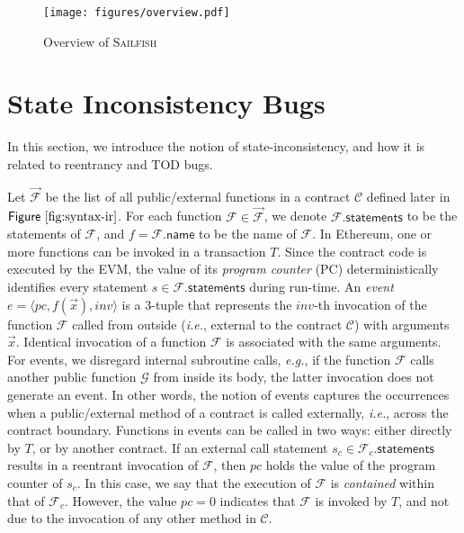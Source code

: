\documentclass[conference, romanappendices]{tex/IEEEtran}
\theoremstyle{bfnote}
\newcommand{\toolname}{\textsc{Sailfish}\xspace}
\newcommand{\ethereum}{Ethereum}
\newcommand{\reentrancy}{{reentrancy}\xspace}
\newcommand{\si}{{state-inconsistency}\xspace}
\newcommand{\eg}{\textit{e.g.}}
\newcommand{\ie}{\textit{i.e.}}
\newcommand{\Fig}[1]{\ensuremath{\sf Figure~\ref{#1}}}
\begin{document}
\begin{figure}[t]
	\vspace{-2mm}
	\centering
	\texttt{[image: figures/overview.pdf]}
	\vspace{-10mm}
	\caption{Overview of \toolname}
	\label{fig:overview}
	\vspace{-6.5mm}
\end{figure}
 	\section{State Inconsistency Bugs}
\label{si_bugs}
In this section, we introduce the notion of \si, and how it is related to \reentrancy and TOD bugs.

Let $\vec{\mathcal{F}}$ be the list of all public/external functions in a contract $\mathcal{C}$ defined later in \Fig{fig:syntax-ir}.
For each function $\mathcal{F} \in \vec{\mathcal{F}}$, we denote $\mathcal{F}.\mathsf{statements}$ to be the statements of $\mathcal{F}$, and $f = \mathcal{F}.\mathsf{name}$ to be the name of $\mathcal{F}$.
In \ethereum, one or more functions can be invoked in a transaction $T$.
Since the contract code is executed by the EVM, the value of its \textit{program counter} (PC) deterministically identifies every statement $s \in \mathcal{F}.\mathsf{statements}$ during run-time.
An \textit{event} $e = \langle pc, f(\vec{x}), inv \rangle$ is a $3$-tuple that represents the $inv$-th invocation of the function $\mathcal{F}$ called from outside (\ie, external to the contract $\mathcal{C}$) with arguments $\vec{x}$.
Identical invocation of a function $\mathcal{F}$ is associated with the same arguments.
For events, we disregard internal subroutine calls, \eg, if the function $\mathcal{F}$ calls another public function $\mathcal{G}$ from inside its body, the latter invocation does not generate an event.
In other words, the notion of events captures the occurrences when a public/external method of a contract is called externally, \ie, across the contract boundary.
Functions in events can be called in two ways: either directly by $T$, or by another contract.
If an external call statement $s_c \in \mathcal{F}_c.\mathsf{statements}$ results in a reentrant invocation of $\mathcal{F}$, then $pc$ holds the value of the program counter of $s_c$.
In this case, we say that the execution of $\mathcal{F}$ is \textit{contained} within that of $\mathcal{F}_c$.
However, the value $pc = 0$ indicates that $\mathcal{F}$ is invoked by $T$, and not due to the invocation of any other method in $\mathcal{C}$. 
\end{document}

